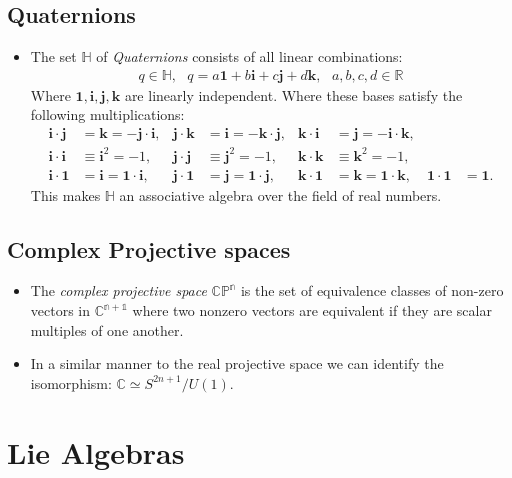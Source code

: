 \documentclass[11pt]{article}
\numberwithin{equation}{section}
\DeclareRobustCommand{\RR}{\mathbb{R}}
\begin{document}
\subsection{Quaternions} 
\begin{itemize}
  \item The set $\mathbb{H}$ of \emph{Quaternions} consists of all linear combinations:
  \begin{align*}
    q \in \mathbb{H}, ~~~q = a \boldsymbol{1} + b\boldsymbol{i} + c\boldsymbol{j} + d\boldsymbol{k},~~~a,b,c,d\in \RR
  \end{align*}
  Where $\boldsymbol{1},\boldsymbol{i},\boldsymbol{j},\boldsymbol{k}$ are linearly independent. Where these bases satisfy the following multiplications:
\begin{align*}
    \bm{i} \cdot \bm{j} &= \bm{k} = -\bm{j} \cdot \bm{i}, & \bm{j} \cdot \bm{k} &= \bm{i} = -\bm{k} \cdot \bm{j}, & \bm{k} \cdot \bm{i} &= \bm{j} = -\bm{i} \cdot \bm{k}, \\
    \bm{i} \cdot \bm{i} &\equiv \bm{i}^2 = -1, & \bm{j} \cdot \bm{j} &\equiv \bm{j}^2 = -1, & \bm{k} \cdot \bm{k} &\equiv \bm{k}^2 = -1, \\
    \bm{i} \cdot \bm{1} &= \bm{i} = \bm{1} \cdot \bm{i}, & \bm{j} \cdot \bm{1} &= \bm{j} = \bm{1} \cdot \bm{j}, & \bm{k} \cdot \bm{1} &= \bm{k} = \bm{1} \cdot \bm{k}, & \bm{1} \cdot \bm{1} &= \bm{1}.
\end{align*}
This makes $\mathbb{H}$ an associative algebra over the field of real numbers. 

\end{itemize}

\subsection{Complex Projective spaces}
\begin{itemize}
  \item The \emph{complex projective space} $\mathbb{CP^n}$ is the set of equivalence classes of non-zero vectors in $\mathbb{C^{n+1}}$ where two nonzero vectors are equivalent if they are scalar multiples of one another. 

  \item In a similar manner to the real projective space we can identify the isomorphism: $\mathbb{C} \simeq S^{2n+1}/U(1)$. 
\end{itemize}

\newpage 
\section{Lie Algebras}
\end{document}
